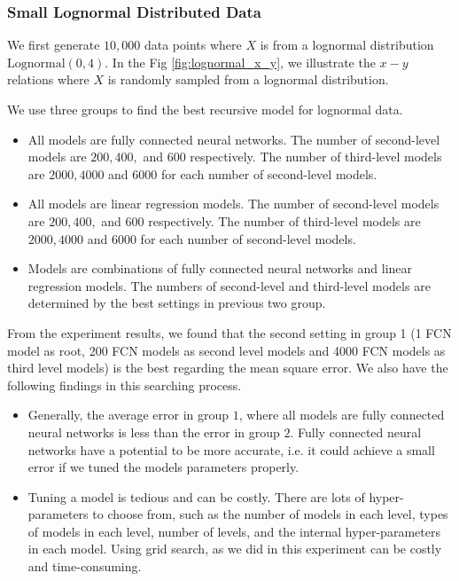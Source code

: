 \subsubsection{Small Lognormal Distributed Data}

We first generate $10,000$ data points where $X$ is from a lognormal distribution $\text{Lognormal}(0, 4)$. In the Fig \ref{fig:lognormal_x_y}, we illustrate the $x-y$ relations where $X$ is randomly sampled from a lognormal distribution.

We use three groups to find the best recursive model for lognormal data.
\begin{itemize}
	\item All models are fully connected neural networks. The number of second-level models are $200, 400,$ and $600$ respectively. The number of third-level models are $2000, 4000$ and $6000$ for each number of second-level models.
	\item All models are linear regression models. The number of second-level models are $200, 400,$ and $600$ respectively. The number of third-level models are $2000, 4000$ and $6000$ for each number of second-level models.
	\item Models are combinations of fully connected neural networks and linear regression models. The numbers of second-level and third-level models are determined by the best settings in previous two group.
\end{itemize}

\begin{figure}
	
\end{figure}

From the experiment results, we found that the second setting in group 1 (1 FCN model as root, 200 FCN models as second level models and 4000 FCN models as third level models) is the best regarding the mean square error. We also have the following findings in this searching process.

\begin{itemize}
	\item Generally, the average error in group $1$, where all models are fully connected neural networks is less than the error in group $2$. Fully connected neural networks have a potential to be more accurate, i.e. it could achieve a small error if we tuned the models parameters properly.
	\item Tuning a model is tedious and can be costly. There are lots of hyper-parameters to choose from, such as the number of models in each level, types of models in each level, number of levels, and the internal hyper-parameters in each model. Using grid search, as we did in this experiment can be costly and time-consuming.
\end{itemize}

